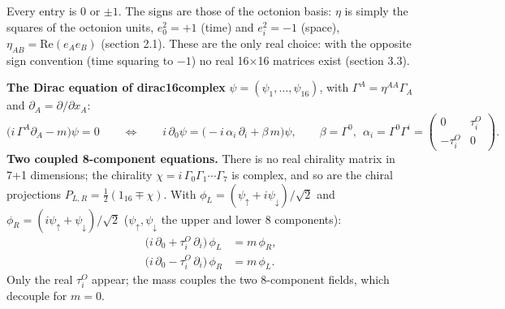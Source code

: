 \documentclass[10pt,a4paper]{article}
\begin{document}
Every entry is $0$ or $\pm1$. The signs are those of the octonion basis: $\eta$ is simply the squares of the octonion units, $e_0^2=+1$ (time) and $e_i^2=-1$ (space), $\eta_{AB}=\mathrm{Re}(e_Ae_B)$ (section 2.1). These are the only real choice: with the opposite sign convention (time squaring to $-1$) no real 16×16 matrices exist (section 3.3).

\textbf{The Dirac equation of dirac16complex} $\psi=(\psi_1,\dots,\psi_{16})$, with $\Gamma^A=\eta^{AA}\Gamma_A$ and $\partial_A=\partial/\partial x_A$:
\begin{equation*}
\big(i\,\Gamma^A\partial_A-m\big)\psi=0\qquad\Longleftrightarrow\qquad i\,\partial_0\psi=\big(-i\,\alpha_i\,\partial_i+\beta\,m\big)\psi,\qquad \beta=\Gamma^0,\ \ \alpha_i=\Gamma^0\Gamma^i=\begin{pmatrix}0&\tau^{O}_i\\-\tau^{O}_i&0\end{pmatrix}.
\end{equation*}
\textbf{Two coupled 8-component equations.} There is no real chirality matrix in 7+1 dimensions; the chirality $\chi=i\,\Gamma_0\Gamma_1\cdots\Gamma_7$ is complex, and so are the chiral projections $P_{L,R}=\tfrac12(1_{16}\mp\chi)$. With $\phi_L=(\psi_{\uparrow}+i\psi_{\downarrow})/\sqrt2$ and $\phi_R=(i\psi_{\uparrow}+\psi_{\downarrow})/\sqrt2$ ($\psi_\uparrow,\psi_\downarrow$ the upper and lower 8 components):
\begin{align*}
\big(i\,\partial_0+\tau^{O}_i\,\partial_i\big)\,\phi_L&=m\,\phi_R, \\
\big(i\,\partial_0-\tau^{O}_i\,\partial_i\big)\,\phi_R&=m\,\phi_L .
\end{align*}
Only the real $\tau^{O}_i$ appear; the mass couples the two 8-component fields, which decouple for $m=0$.
\end{document}
